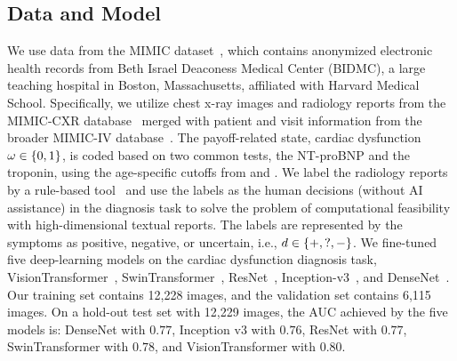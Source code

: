 \subsection{Data and Model}
 \mvspace{-2mm}
We use data from the MIMIC dataset~\citep{goldberger2000physiobank}, which contains anonymized electronic health records from Beth Israel Deaconess Medical Center (BIDMC), a large teaching hospital in Boston, Massachusetts, affiliated with Harvard Medical School.
Specifically, we utilize chest x-ray images and radiology reports from the MIMIC-CXR database~\citep{johnson2019mimic} merged with patient and visit information from the broader MIMIC-IV database~\citep{johnson2023mimic}.
The payoff-related state, cardiac dysfunction $\omega\in \{0,1\}$, is coded based on two common tests, the NT-proBNP and the troponin, using the age-specific cutoffs from \citet{mueller2019heart} and \citet{heidenreich20222022}.
We label the radiology reports by a rule-based tool~\citep{irvin2019chexpert} and use the labels as the human decisions (without AI assistance) in the diagnosis task to solve the problem of computational feasibility with high-dimensional textual reports.
The labels are represented by the symptoms as positive, negative, or uncertain, i.e., $d \in \{+, ?, -\}$.
We fine-tuned five deep-learning models on the cardiac dysfunction diagnosis task, VisionTransformer~\citep{alexey2020image}, SwinTransformer~\citep{liu2021swin}, ResNet~\citep{he2016deep}, Inception-v3~\citep{szegedy2016rethinking}, and DenseNet~\citep{huang2017densely}.
Our training set contains 12,228 images, and the validation set contains 6,115 images.
On a hold-out test set with 12,229 images, the AUC achieved by the five models is: DenseNet with $0.77$, Inception v3 with $0.76$, ResNet with $0.77$, SwinTransformer with $0.78$, and VisionTransformer with $0.80$.

